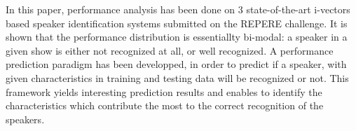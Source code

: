 \vspace*{-0.1cm}
In this paper, performance analysis has been done on 3 state-of-the-art i-vectors based speaker identification systems submitted on the REPERE challenge. It is shown that the performance distribution is essentiallty bi-modal: a speaker in a given show is either not recognized at all, or well recognized. A performance prediction paradigm has been developped, in order to predict if a speaker, with given characteristics in training and testing data will be recognized or not. This framework yields interesting prediction results  and enables to identify the characteristics which contribute the most to the correct recognition of the speakers.